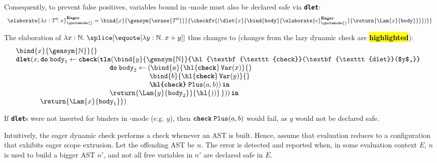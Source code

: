 Consequently, to prevent false positives, variables bound in \quotemode{}-mode must also be declared safe via \textbf{\texttt{dlet}}:
{
  \footnotesize
\[
\begin{array}{rcl}
\elaborate{\lambda x: T^0. \, e}_{\quotemode{}}^{\textbf{Eager}} = \bind{x}{\gensym{\erase{T^0}}}{\checkfv{(\dlet{x}{\bind{\texttt{body}}{\elaborate{e}_{\quotemode{}}^\textbf{Eager}}{\return{\Lam{x}{\texttt{body}}}}})}}
\end{array}\]
}

The elaboration of $\lambda x:\mathbb{N}. \; \splice[{\equote[\lambda{y}: \mathbb{N}. \; x+y]}]$ thus changes to (changes from the lazy dynamic check are \textbf{\hl{highlighted}}):
{
  \renewcommand{\varToAST}[1]{\hl{\textbf{\texttt{check}}}\, \texttt{Var}(#1)}
\[\begin{array}{@{}l}
  \bind{x}{\gensym{\mathbb{N}}}{} \\
  {\textbf{\texttt{dlet}}(}{x}, \textbf{\texttt{do}} \; {\texttt{body}_1} \leftarrow {\textbf{\texttt{check}}(}\textbf{\texttt{tls}}({\bind{y}{\gensym{\mathbb{N}}}{\hl{\textbf{\texttt{check}}(\textbf{\texttt{dlet}}($y$,}}} \\
    \quad\quad\quad\quad\quad\quad\quad
    \quad\quad\quad\quad\quad\quad\,\,
    \textbf{\texttt{do}}\;{\texttt{body}_2} \leftarrow {(\bind{a}{{\varToAST{x}}}{}}\\
    \quad\quad\quad\quad\quad\quad\quad\quad
    \quad\quad\quad\quad\quad\quad\quad\quad
    \quad\quad\quad
    \bind{b}{{\varToAST{y}}}{}\\
    \quad\quad\quad\quad\quad\quad\quad\quad
    \quad\quad\quad\quad\quad\quad\quad\quad
    \quad\quad\quad
    \textbf{\texttt{\hl{check}}}\;{\texttt{Plus}(a, b)}) \, \textbf{\texttt{in}}\\
    \quad\quad\quad\quad\quad\quad\quad
    \quad\quad\quad\quad\quad\quad\,\,
    \return{\Lam{y}{\texttt{body}_2}}{\hl{))}\,})) \, \textbf{\texttt{in}}\\
  \quad\quad\quad\;\, {\return{\Lam{x}{\texttt{body}_1}}})
\end{array}\]
}

If \textbf{\texttt{dlet}}s were not inserted for binders in \quotemode{}-mode (e.g. $y$), then $\textbf{\texttt{check}}\; \texttt{Plus}(a, b)$ would fail, as $y$ would not be declared safe. 

Intuitively, the eager dynamic check performs a check whenever an AST is built. Hence, assume that evaluation reduces to a configuration that exhibits eager scope extrusion. Let the offending AST be $n$. The error is detected and reported when, in some evaluation context $E$, $n$ is used to build a bigger AST $n'$, and not all free variables in $n'$ are declared safe in $E$. 

